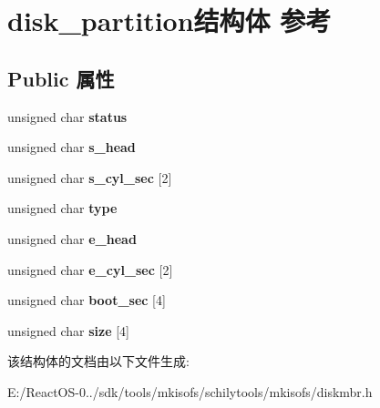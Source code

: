 \hypertarget{structdisk__partition}{}\section{disk\+\_\+partition结构体 参考}
\label{structdisk__partition}
\subsection*{Public 属性}
\begin{DoxyCompactItemize}
\item 
\mbox{\label{structdisk__partition_abc8735591cad2e55cbe66e75761a9d55}} 
unsigned char {\bfseries status}
\item 
\mbox{\label{structdisk__partition_ac8f2b8c644e0fc6e869438e463e222be}} 
unsigned char {\bfseries s\+\_\+head}
\item 
\mbox{\label{structdisk__partition_aa10939fa9f6077de194161c591a7f1f5}} 
unsigned char {\bfseries s\+\_\+cyl\+\_\+sec} \mbox{[}2\mbox{]}
\item 
\mbox{\label{structdisk__partition_aa2100672d937bd60d9cb449e5c1084a1}} 
unsigned char {\bfseries type}
\item 
\mbox{\label{structdisk__partition_a917da18fa4d96c24a3f38ae107fde254}} 
unsigned char {\bfseries e\+\_\+head}
\item 
\mbox{\label{structdisk__partition_a836a6a8918ff24a2e6b3243798ffe72a}} 
unsigned char {\bfseries e\+\_\+cyl\+\_\+sec} \mbox{[}2\mbox{]}
\item 
\mbox{\label{structdisk__partition_ad39ccd9074f342e332b2353e0defdb29}} 
unsigned char {\bfseries boot\+\_\+sec} \mbox{[}4\mbox{]}
\item 
\mbox{\label{structdisk__partition_a45ba3b0165aa53ede7942ed51179b864}} 
unsigned char {\bfseries size} \mbox{[}4\mbox{]}
\end{DoxyCompactItemize}


该结构体的文档由以下文件生成\+:\begin{DoxyCompactItemize}
\item 
E\+:/\+React\+O\+S-\/0../sdk/tools/mkisofs/schilytools/mkisofs/diskmbr.\+h\end{DoxyCompactItemize}
